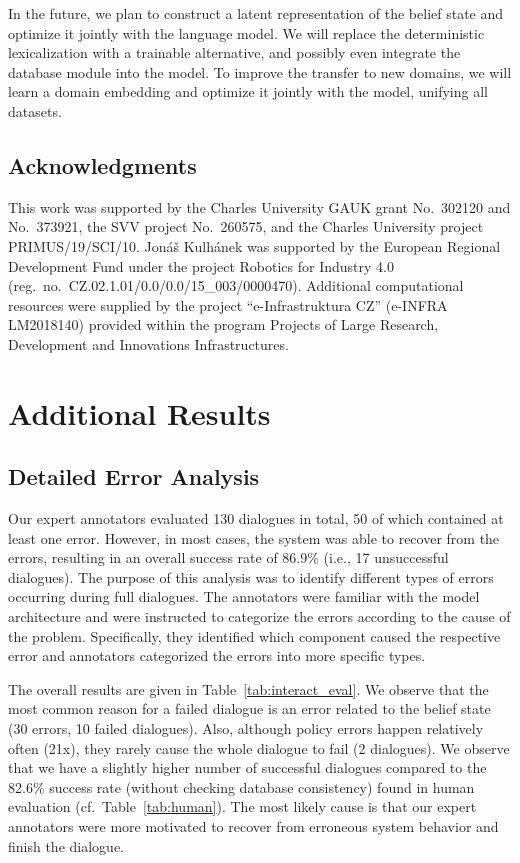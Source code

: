 \documentclass[11pt]{article}
\begin{document}
In the future, we plan to construct a latent representation of the belief state and optimize it jointly with the language model. We will replace the deterministic lexicalization with a trainable alternative, and possibly even integrate the database module into the model. To improve the transfer to new domains, we will learn a domain embedding and optimize it jointly with the model, unifying all datasets.

\subsection*{Acknowledgments}
This work was supported by the Charles University GAUK grant No.~302120 and No.~373921, the SVV project No.~260575, and the Charles University project PRIMUS/19/SCI/10.
Jonáš Kulhánek was supported by the European Regional Development Fund under the project Robotics for Industry 4.0 (reg.~no.\ CZ.02.1.01/0.0/0.0/15\_003/0000470). Additional computational resources were supplied by the project ``e-Infrastruktura CZ'' (e-INFRA LM2018140) provided within the program Projects of Large Research, Development and Innovations Infrastructures.




\clearpage
\appendix
\section{Additional Results}
\label{sec:appendix}
\subsection{Detailed Error Analysis}
Our expert annotators evaluated 130 dialogues in total, 50 of which contained at least one error.
However, in most cases, the system was able to recover from the errors, resulting in an overall success rate of 86.9\% (i.e., 17 unsuccessful dialogues).
The purpose of this analysis was to identify different types of errors occurring during full dialogues.
The annotators were familiar with the model architecture and were instructed to categorize the errors according to the cause of the problem.
Specifically, they identified which component caused the respective error
and annotators categorized the errors into more specific types.

The overall results are given in Table~\ref{tab:interact_eval}.
We observe that the most common reason for a failed dialogue is an error related to the belief state (30 errors, 10 failed dialogues).
Also, although policy errors happen relatively often (21x), they rarely cause the whole dialogue to fail (2 dialogues).
We observe that we have a slightly higher number of successful dialogues compared to the 82.6\% success rate (without checking database consistency) found in human evaluation (cf.\ Table~\ref{tab:human}).
The most likely cause is that our expert annotators were more motivated to recover from erroneous system behavior and finish the dialogue.
\end{document}

